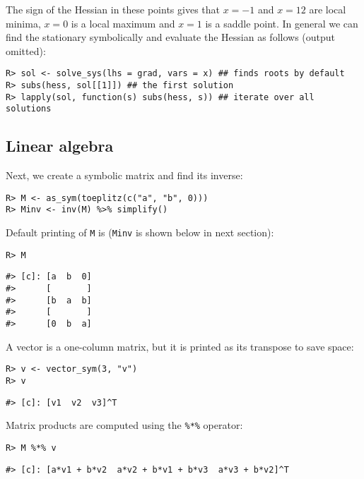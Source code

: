 The sign of the Hessian in these points gives that \(x=-1\) and \(x=12\)
are local minima, \(x=0\) is a local maximum and \(x=1\) is a saddle
point.
In general we can find the stationary symbolically and evaluate the Hessian as follows (output omitted):

\begin{verbatim}
R> sol <- solve_sys(lhs = grad, vars = x) ## finds roots by default
R> subs(hess, sol[[1]]) ## the first solution
R> lapply(sol, function(s) subs(hess, s)) ## iterate over all solutions
\end{verbatim}

\hypertarget{linear-algebra}{%
\subsection{Linear algebra}\label{linear-algebra}}

Next, we create a symbolic matrix and find its inverse:

\begin{verbatim}
R> M <- as_sym(toeplitz(c("a", "b", 0)))
R> Minv <- inv(M) %>% simplify()
\end{verbatim}

Default printing of \texttt{M} is (\texttt{Minv} is shown below in next section):

\begin{verbatim}
R> M
\end{verbatim}

\begin{verbatim}
#> [c]: [a  b  0]
#>      [       ]
#>      [b  a  b]
#>      [       ]
#>      [0  b  a]
\end{verbatim}

A vector is a one-column matrix, but it is printed as its transpose to save space:

\begin{verbatim}
R> v <- vector_sym(3, "v")
R> v
\end{verbatim}

\begin{verbatim}
#> [c]: [v1  v2  v3]^T
\end{verbatim}

Matrix products are computed using the \texttt{\%*\%} operator:

\begin{verbatim}
R> M %*% v
\end{verbatim}

\begin{verbatim}
#> [c]: [a*v1 + b*v2  a*v2 + b*v1 + b*v3  a*v3 + b*v2]^T
\end{verbatim}

